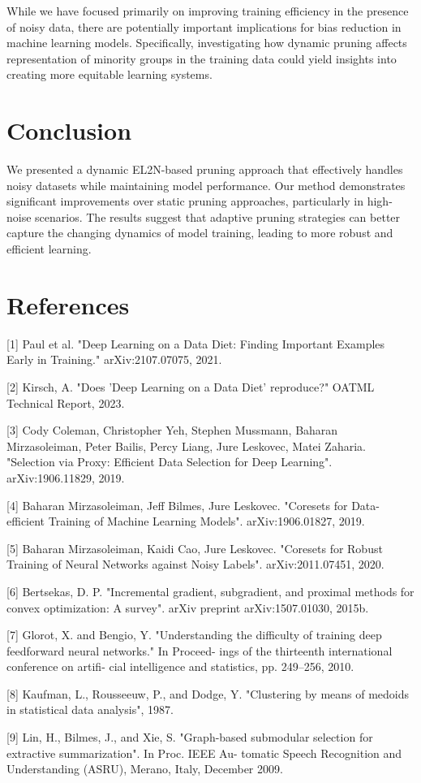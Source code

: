 \documentclass{article}
\begin{document}
While we have focused primarily on improving training efficiency in the presence of noisy data, there are potentially important implications for bias reduction in machine learning models. Specifically, investigating how dynamic pruning affects representation of minority groups in the training data could yield insights into creating more equitable learning systems.

\section{Conclusion}
We presented a dynamic EL2N-based pruning approach that effectively handles noisy datasets while maintaining model performance. Our method demonstrates significant improvements over static pruning approaches, particularly in high-noise scenarios. The results suggest that adaptive pruning strategies can better capture the changing dynamics of model training, leading to more robust and efficient learning.

\section*{References}
{
\small

[1] Paul et al. "Deep Learning on a Data Diet: Finding Important Examples Early in Training." arXiv:2107.07075, 2021.

[2] Kirsch, A. "Does 'Deep Learning on a Data Diet' reproduce?" OATML Technical Report, 2023.

[3] Cody Coleman, Christopher Yeh, Stephen Mussmann, Baharan Mirzasoleiman, Peter Bailis, Percy Liang, Jure Leskovec, Matei Zaharia. "Selection via Proxy: Efficient Data Selection for Deep Learning". arXiv:1906.11829, 2019.

[4] Baharan Mirzasoleiman, Jeff Bilmes, Jure Leskovec. "Coresets for Data-efficient Training of Machine Learning Models". arXiv:1906.01827, 2019.

[5] Baharan Mirzasoleiman, Kaidi Cao, Jure Leskovec. "Coresets for Robust Training of Neural Networks against Noisy Labels". arXiv:2011.07451, 2020.

[6] Bertsekas, D. P. "Incremental gradient, subgradient, and proximal methods for convex optimization: A survey". arXiv preprint arXiv:1507.01030, 2015b.

[7] Glorot, X. and Bengio, Y. "Understanding the difficulty of training deep feedforward neural networks." In Proceed- ings of the thirteenth international conference on artifi- cial intelligence and statistics, pp. 249–256, 2010.

[8] Kaufman, L., Rousseeuw, P., and Dodge, Y. "Clustering by means of medoids in statistical data analysis", 1987.

[9] Lin, H., Bilmes, J., and Xie, S. "Graph-based submodular selection for extractive summarization". In Proc. IEEE Au- tomatic Speech Recognition and Understanding (ASRU), Merano, Italy, December 2009.

}
\end{document}
